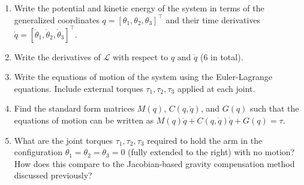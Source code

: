 \documentclass{16384_doc}
\begin{document}
\begin{questions}
    \begin{enumerate}[label=\alph*.]
        \item \text{[10 points]} Write the potential and kinetic energy of the system in terms of the generalized coordinates $q = [\theta_1, \theta_2, \theta_3]^\top$ and their time derivatives $\dot q = [\dot \theta_1, \dot \theta_2, \dot \theta_3]^\top$.
        \begin{tcolorbox}[height=4cm]
        \end{tcolorbox}

        \pagebreak
        \item \text{[10 points]} Write the derivatives of $\mathcal L$ with respect to $q$ and $\dot q$ (6 in total).
        \begin{tcolorbox}[height=6cm]
        \end{tcolorbox}

        \item \text{[10 points]} Write the equations of motion of the system using the Euler-Lagrange equations. Include external torques $\tau_1, \tau_2, \tau_3$ applied at each joint.
        \begin{tcolorbox}[height=3cm]
        \end{tcolorbox}

        \item \text{[5 points]} Find the standard form matrices $M(q)$, $C(q, \dot q)$, and $G(q)$ such that the equations of motion can be written as $M(q)\ddot q + C(q, \dot q)\dot q + G(q) = \tau$.
        \begin{tcolorbox}[height=3cm]
        \end{tcolorbox}

        \item \text{[5 points]} What are the joint torques $\tau_1, \tau_2, \tau_3$ required to hold the arm in the configuration $\theta_1 = \theta_2 = \theta_3 = 0$ (fully extended to the right) with no motion? How does this compare to the Jacobian-based gravity compensation method discussed previously?
        \begin{tcolorbox}[height=3cm]
        \end{tcolorbox}
    \end{enumerate}


\end{questions}

\end{document}
